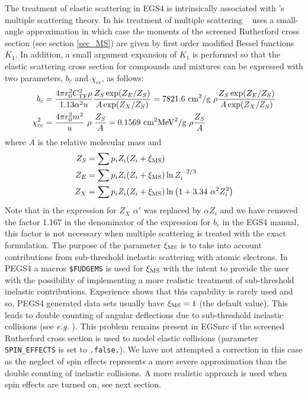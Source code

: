 The treatment of elastic scattering in EGS4 is intrinsically 
associated with \Mol's multiple scattering theory\cite{Mo48}. 
In his treatment of multiple scattering \Mol~ uses a small-angle 
approximation in which case the moments of the screened Rutherford 
cross section (see section \ref{sec_MS}) are given by 
first order modified Bessel functions $K_1$. 
In addition, a small argument expansion of $K_1$ is performed 
so that the elastic scattering cross section for 
compounds and mixtures can be expressed with two 
parameters, $b_c$ and $\chi_{cc}$, as follows:
\begin{equation}
\begin{split}
b_c & =  {4 \pi r_0^2 C_{\rm TF}^2 \rho \over 1.13 \alpha^2 u} 
{Z_S \exp(Z_E/Z_S) \over A \exp(Z_X/Z_S)} = 7821.6~ \mbox{cm}^2/\mbox{g}~\rho 
{ Z_S \exp(Z_E/Z_S) \over A \exp(Z_X/Z_S)} \\
\chi_{cc}^2 & = {4 \pi r_0^2 m^2 \over u}~\rho~\frac{Z_S}{A} = 0.1569~ 
\mbox{cm}^2 \mbox{MeV}^2 / \mbox{g}~\rho \frac{Z_S}{A}
\end{split}
\end{equation}
where $A$ is the relative molecular mass and 
\begin{equation}
\begin{split}
Z_S & = \sum p_i Z_i (Z_i + \xi_{\rm MS} ) \\
Z_E & = \sum p_i Z_i (Z_i + \xi_{\rm MS} ) \ln Z_i^{-2/3} \\
Z_X & = \sum p_i Z_i (Z_i + \xi_{\rm MS} ) \ln \left(1 + 3.34~ \alpha^2 Z_i^2 
\right)
\end{split}
\end{equation}
Note that in the expression for $Z_X$ $\alpha'$ was replaced 
by $\alpha Z_i$ and we have removed the factor 1.167 in the 
denominator of the expression for $b_c$ in the EGS4 manual, 
this factor is not necessary when multiple scattering is 
treated with the exact formulation. The purpose of the 
parameter $\xi_{\rm MS}$ is to take into account 
contributions from sub-threshold inelastic scattering 
with atomic electrons. In PEGS4 a macros {\tt \$FUDGEMS} is 
used for $\xi_{\rm MS}$ with the intent to provide 
the user with the possibility of implementing a more 
realistic treatment of sub-threshold inelastic 
contributions. Experience shows that 
this capability is rarely used and so, PEGS4 generated 
data sets usually have $\xi_{\rm MS}=1$ (the default value). 
This leads to double counting of angular deflections due 
to sub-threshold inelastic collisions (see {\em e.g.} \cite{LR94a}).  
This problem remains present in EGSnrc if the screened 
Rutherford cross section is used to model elastic collisions 
(parameter {\tt SPIN\_EFFECTS} is set to {\tt .false.}). 
We have not attempted a correction in this case as the neglect of spin 
effects represents a more severe approximation than the 
double counting of inelastic collisions. A more 
realistic approach is used when spin effects are turned on, 
see next section. 

